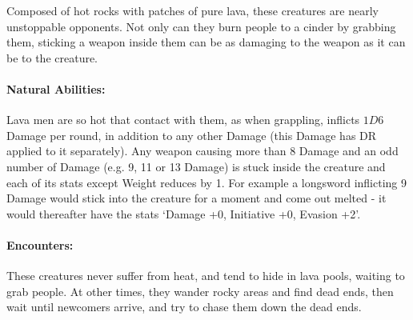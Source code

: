 \begin{multicols}{2}
\archmage

\label{lavaman}

Composed of hot rocks with patches of pure lava, these creatures are nearly unstoppable opponents.  Not only can they burn people to a cinder by grabbing them, sticking a weapon inside them can be as damaging to the weapon as it can be to the creature.

\paragraph{Natural Abilities:} Lava men are so hot that contact with them, as when grappling, inflicts $1D6$ Damage per round, in addition to any other Damage (this Damage has DR applied to it separately).  Any weapon causing more than 8 Damage and an odd number of Damage (e.g. 9, 11 or 13 Damage) is stuck inside the creature and each of its stats except Weight reduces by 1.  For example a longsword inflicting 9 Damage would stick into the creature for a moment and come out melted - it would thereafter have the stats `Damage +0, Initiative +0, Evasion +2'.

\paragraph{Encounters:} These creatures never suffer from heat, and tend to hide in lava pools, waiting to grab people.
At other times, they wander rocky areas and find dead ends, then wait until newcomers arrive, and try to chase them down the dead ends.

\lavaman

\end{multicols}

